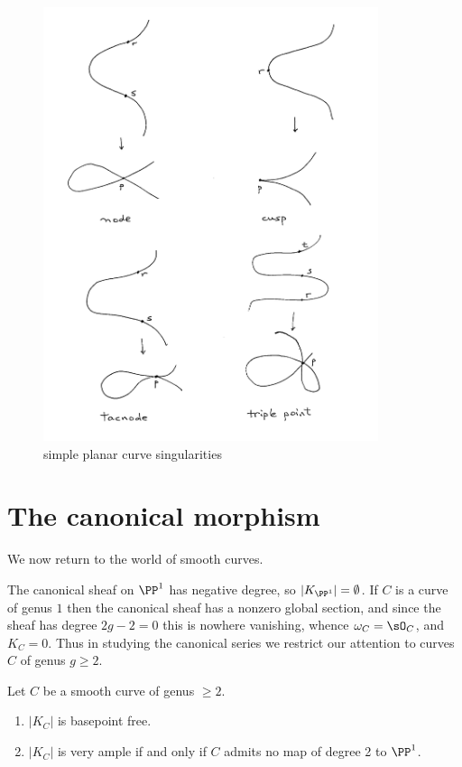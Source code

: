 \begin{figure}
 \caption{simple planar curve singularities}
\centerline {\includegraphics[height=5in]{"Fig2.2"}}
\end{figure}


\section{The canonical morphism}

We now return to the world of smooth curves.

 The canonical sheaf on $\PP^1$ has negative degree, so $|K_{\PP^1}| = \emptyset$. If $C$ is a curve
 of genus $1$ then the canonical sheaf     has a nonzero global section, and since the sheaf has degree $2g-2=0$ this is nowhere vanishing, whence
 $\omega_C = \sO_C$, and $K_C = 0$. Thus in studying the canonical series we restrict our attention to curves $C$ of genus $g\geq 2$. 
 
 \begin{theorem}\label{canonical series is very ample} Let $C$ be a smooth curve of genus $\geq 2$.
\begin{enumerate}
 \item $|K_C|$ is basepoint free.
 \item $|K_C|$ is very ample if and only if $C$ admits no map of degree 2 to $\PP^1$.
\end{enumerate}
\end{theorem}

